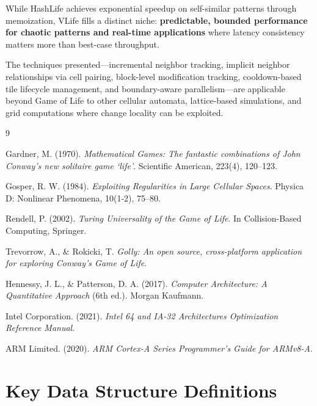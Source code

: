 \documentclass[11pt]{article}
\theoremstyle{definition}
\begin{document}
    While HashLife achieves exponential speedup on self-similar patterns through memoization, VLife fills a distinct niche: \textbf{predictable, bounded performance for chaotic patterns and real-time applications} where latency consistency matters more than best-case throughput.

    The techniques presented---incremental neighbor tracking, implicit neighbor relationships via cell pairing, block-level modification tracking, cooldown-based tile lifecycle management, and boundary-aware parallelism---are applicable beyond Game of Life to other cellular automata, lattice-based simulations, and grid computations where change locality can be exploited.

    \begin{thebibliography}{9}

        Gardner, M. (1970).
        \textit{Mathematical Games: The fantastic combinations of John Conway's new solitaire game `life'}.
        Scientific American, 223(4), 120--123.

        Gosper, R. W. (1984).
        \textit{Exploiting Regularities in Large Cellular Spaces}.
        Physica D: Nonlinear Phenomena, 10(1-2), 75--80.

        Rendell, P. (2002).
        \textit{Turing Universality of the Game of Life}.
        In Collision-Based Computing, Springer.

        Trevorrow, A., \& Rokicki, T.
        \textit{Golly: An open source, cross-platform application for exploring Conway's Game of Life}.

        Hennessy, J. L., \& Patterson, D. A. (2017).
        \textit{Computer Architecture: A Quantitative Approach} (6th ed.).
        Morgan Kaufmann.

        Intel Corporation. (2021).
        \textit{Intel 64 and IA-32 Architectures Optimization Reference Manual}.

        ARM Limited. (2020).
        \textit{ARM Cortex-A Series Programmer's Guide for ARMv8-A}.

    \end{thebibliography}

    \appendix

    \section{Key Data Structure Definitions}
\end{document}
